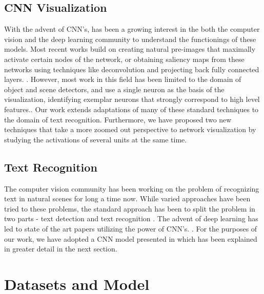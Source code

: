 \documentclass[10pt,twocolumn,letterpaper]{article}
\begin{document}
\subsection{CNN Visualization}
With the advent of CNN's, has been a growing interest in the both the computer vision and the deep learning community to understand the functionings of these models. Most recent works build on creating natural pre-images \cite{DBLP:journals/corr/MahendranV15} that maximally activate certain nodes of the network, or obtaining saliency maps from these networks using techniques like deconvolution \cite{DBLP:journals/corr/ZeilerF13} and
projecting back fully connected layers. \cite{DBLP:journals/corr/SimonyanVZ13}. However, most work in this field has been limited to the domain of object and scene detectors, and use a single neuron as the basis of the visualization, identifying exemplar neurons that strongly correspond to high level features.\cite{zhou2014object,DBLP:journals/corr/GirshickDDM13,DBLP:journals/corr/MahendranV15,DBLP:journals/corr/ZeilerF13,DBLP:journals/corr/SimonyanVZ13,mahendran2015understanding}. Our work extends adaptations of many of these standard techniques \cite{yosinski2015understanding} to the domain of text recognition. Furthermore, we have proposed two new techniques that take a more zoomed out perspective to network visualization by studying the activations of several units at the same time. 

\subsection{Text Recognition}

The computer vision community has been working on the problem of recognizing text in natural scenes for long a time now\cite{1315187}. While varied approaches have been tried to these problems, the standard approach has been to split the problem in two parts - text detection and text recognition \cite{PosnerEtAl-IROS2010,Neumann:2011:TLR:2066306.2067476,Yang:2014:FIV:2583855.2583972,6751121,KaiWang:2011:EST:2355573.2356398,Weinman:2014:TIS:2574225.2574484,DBLP:journals/corr/AlsharifP13,6751207}. The advent of deep learning has led to state of the art papers utilizing the power of CNN's. \cite{Jaderberg14,Jaderberg14d,Gupta16,6460871}. For the purposes of our work, we have adopted a CNN model presented in \cite{Jaderberg14c} which has been explained in greater detail in the next section. 



\section{Datasets and Model}
\end{document}
